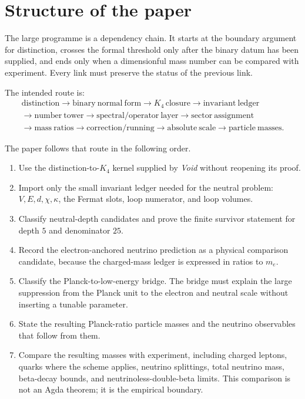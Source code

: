 \documentclass[11pt]{article}
\begin{document}
\section*{Structure of the paper}

The large programme is a dependency chain.  It starts at the boundary
argument for distinction, crosses the formal threshold only after the
binary datum has been supplied, and ends only when a dimensionful mass
number can be compared with experiment.  Every link must preserve the
status of the previous link.

The intended route is:
\[
\begin{array}{c}
\mathrm{distinction}
\to \mathrm{binary\ normal\ form}
\to K_4\,\mathrm{closure}
\to \mathrm{invariant\ ledger} \\
\to \mathrm{number\ tower}
\to \mathrm{spectral/operator\ layer}
\to \mathrm{sector\ assignment} \\
\to \mathrm{mass\ ratios}
\to \mathrm{correction/running}
\to \mathrm{absolute\ scale}
\to \mathrm{particle\ masses}.
\end{array}
\]

The paper follows that route in the following order.

\begin{enumerate}
\item Use the distinction-to-$K_4$ kernel supplied by \emph{Void} without
  reopening its proof.
\item Import only the small invariant ledger needed for the neutral
  problem: $V,E,d,\chi,\kappa$, the Fermat slots, loop numerator, and
  loop volumes.
\item Classify neutral-depth candidates and prove the finite survivor
  statement for depth $5$ and denominator $25$.
\item Record the electron-anchored neutrino prediction as a physical
  comparison candidate, because the charged-mass ledger is expressed in
  ratios to $m_e$.
\item Classify the Planck-to-low-energy bridge.  The bridge must explain
  the large suppression from the Planck unit to the electron and neutral
  scale without inserting a tunable parameter.
\item State the resulting Planck-ratio particle masses and the neutrino
  observables that follow from them.
\item Compare the resulting masses with experiment, including charged
  leptons, quarks where the scheme applies, neutrino splittings, total
  neutrino mass, beta-decay bounds, and neutrinoless-double-beta limits.
  This comparison is not an Agda theorem; it is the empirical boundary.
\end{enumerate}
\end{document}
